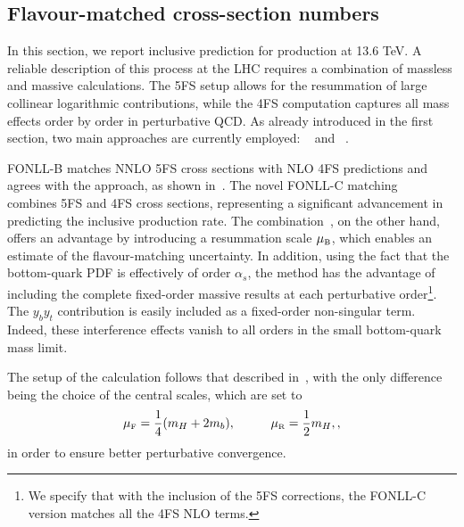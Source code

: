 \documentclass[11pt,a4paper]{article}
\begin{document}
\subsection{Flavour-matched cross-section numbers}\label{sec:matchedinclusivenumbers}
In this section, we report inclusive prediction for \bbH{} production at 13.6 TeV. A reliable description of this process at the LHC requires a combination of massless and massive calculations. The 5FS setup allows for the resummation of large collinear logarithmic contributions, while the 4FS computation captures all mass effects order by order in perturbative QCD. As already introduced in the first section, two main approaches are currently employed: \fonll{}~\cite{forte:2015hba,forte:2016sja,Duhr:2020kzd} and \nlonnllpart{}~\cite{Bonvini:2015pxa,Bonvini:2016fgf}. 

FONLL-B matches NNLO 5FS cross sections with NLO 4FS predictions and agrees with the \nlonnllpart{} approach, as shown in~. The novel FONLL-C matching~\cite{Duhr:2020kzd} combines \fnnnlo{} 5FS and \fnlo{} 4FS cross sections, representing a significant advancement in predicting the \bbH{} inclusive production rate. The \nlonnllpart{} combination~\cite{Bonvini:2016fgf}, on the other hand, offers an advantage by introducing a resummation scale $\muB$, which enables an estimate of the flavour-matching uncertainty. In addition, using the fact that the bottom-quark PDF is effectively of order $\alpha_s$, the method has the advantage of including the complete fixed-order massive results at each perturbative order\footnote{We specify that with the inclusion of the \fnnnlo{} 5FS corrections, the FONLL-C version matches all the 4FS NLO terms.}. The $y_by_t$  contribution is easily included as a fixed-order non-singular term. Indeed, these interference effects vanish to all orders in the small bottom-quark mass limit.

The setup of the calculation follows that described in~, with the only difference being the choice of the central scales, which are set to
\begin{align}
\muF=\frac{1}{4}(m_H+2m_b),\hspace{1cm}\muR=\frac{1}{2}m_H,,
\end{align}
in order to ensure better perturbative convergence.
\end{document}
